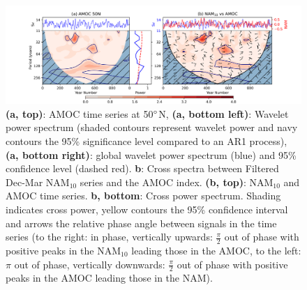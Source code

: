 \newpage
\begin{figure}[h!]
\begin{center}
\noindent\includegraphics[width = \linewidth]{Figures/Figures-surface/AMOC_NAM_filtered_subplot.png}
\caption[Wavelet power spectrum of the AMOC at 50$\degree$N]{\textbf{(a, top)}: AMOC time series at 50$\degree$N, \textbf{(a, bottom left)}: Wavelet power spectrum (shaded contours represent wavelet power and navy contours the 95\% significance level compared to an AR1 process), \textbf{(a, bottom right)}: global wavelet power spectrum (blue) and 95\% confidence level (dashed red). \textbf{b}: Cross spectra between Filtered Dec-Mar NAM$_{10}$ series and the AMOC index. \textbf{(b, top)}: NAM$_{10}$ and AMOC time series. \textbf{b, bottom}: Cross power spectrum. Shading indicates cross power, yellow contours the 95\% confidence interval and arrows the relative phase angle between signals in the time series (to the right: in phase, vertically upwards: $\frac{\pi}{2}$ out of phase with positive peaks in the NAM$_{10}$ leading those in the AMOC, to the left: $\pi$ out of phase, vertically downwards: $\frac{\pi}{2}$ out of phase with positive peaks in the AMOC leading those in the NAM).}
\label{NAM_AMOC_Cross}
\end{center}
\end{figure}

